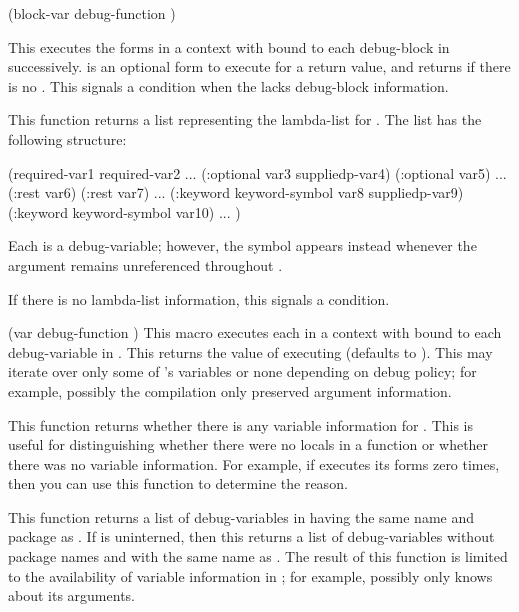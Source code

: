 {
  {(block-var debug-function ) }

This executes the forms in a context with  bound to each
debug-block in  successively.   is
an optional form to execute for a return value, and
 returns \nil if there is no
.  This signals a  condition when the
 lacks debug-block information.
\enddefmac


This function returns a list representing the lambda-list for 
.  The list has the following structure:
\begin{example}
   (required-var1 required-var2
    ...
    (:optional var3 suppliedp-var4)
    (:optional var5)
    ...
    (:rest var6) (:rest var7)
    ...
    (:keyword keyword-symbol var8 suppliedp-var9)
    (:keyword keyword-symbol var10)
    ...
    )
\end{example}
Each  is a debug-variable; however, the symbol
 appears instead whenever the argument remains unreferenced
throughout .

If there is no lambda-list information, this signals a
 condition.
\enddefun


  {(var debug-function ) }
This macro executes each  in a context with  bound to each
debug-variable in .  This returns the value of executing
 (defaults to \nil).  This may iterate over only some of 
's variables or none depending on debug policy; for example,
possibly the compilation only preserved argument information.
\enddefmac


This function returns whether there is any variable information for 
.  This is useful for distinguishing whether there were no
locals in a function or whether there was no variable information.  For
example, if  executes its forms zero times,
then you can use this function to determine the reason.
\enddefun


This function returns a list of debug-variables in  having
the same name and package as .  If  is uninterned, then
this returns a list of debug-variables without package names and with the same
name as .  The result of this function is limited to the
availability of variable information in ; for example,
possibly  only knows about its arguments.
\enddefun


}
